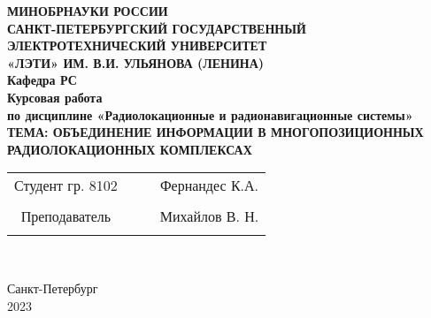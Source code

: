 \begin{center}
\hfill \break
\small{\textbf{{МИНОБРНАУКИ РОССИИ}}}\\
\small{\textbf{{САНКТ-ПЕТЕРБУРГСКИЙ ГОСУДАРСТВЕННЫЙ}}}\\
\small{\textbf{{ЭЛЕКТРОТЕХНИЧЕСКИЙ УНИВЕРСИТЕТ}}}\\
\small{\textbf{«ЛЭТИ» ИМ. В.И. УЛЬЯНОВА (ЛЕНИНА)}}\\
\hfill \break
\normalsize{\textbf{Кафедра РС}}\\
\hfill\break
\hfill \break
\hfill \break
\hfill \break
\small{\textbf{{Курсовая работа}}}\\
\normalsize{\textbf{по дисциплине «Радиолокационные и радионавигационные системы»}}\\
\normalsize{\textbf{ТЕМА: ОБЪЕДИНЕНИЕ ИНФОРМАЦИИ В МНОГОПОЗИЦИОННЫХ
РАДИОЛОКАЦИОННЫХ КОМПЛЕКСАХ
}}\\
\hfill \break
\hfill \break
\hfill \break
\hfill \break
\hfill \break
\hfill \break
\end{center}
 
\hfill \break
 
\normalsize{ 
\begin{tabular}{cccc}
Студент гр. 8102 & \underline{\hspace{3cm}} & &Фернандес К.А. \\\\
Преподаватель & \underline{\hspace{3cm}} & &  Михайлов В. Н.\\\\
\end{tabular}
}\\
\hfill \break
\hfill \break
\begin{center} Санкт-Петербург \\
2023 \end{center}
\thispagestyle{empty} %
 
